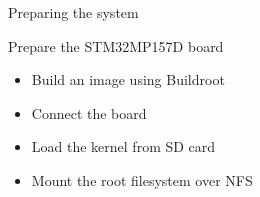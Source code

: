 \setuplabframe
{Preparing the system}
{
  Prepare the STM32MP157D board
  \begin{itemize}
    \item Build an image using Buildroot
    \item Connect the board
    \item Load the kernel from SD card
    \item Mount the root filesystem over NFS
  \end{itemize}
}
